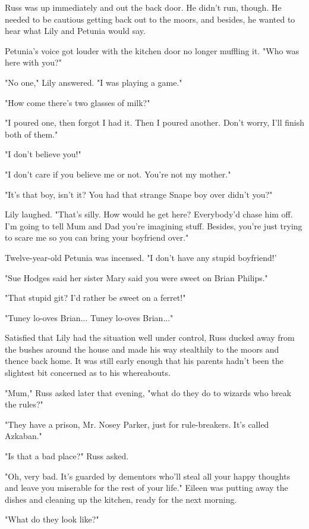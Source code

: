 \documentclass[a4paper,11pt]{article}
\begin{document}
Russ was up immediately and out the back door. He didn't run, though. He needed to be cautious getting back out to the moors, and besides, he wanted to hear what Lily and Petunia would say.

Petunia's voice got louder with the kitchen door no longer muffling it. "Who was here with you?"

"No one," Lily answered. "I was playing a game."

"How come there's two glasses of milk?"

"I poured one, then forgot I had it. Then I poured another. Don't worry, I'll finish both of them."

"I don't believe you!"

"I don't care if you believe me or not. You're not my mother."

"It's that boy, isn't it? You had that strange Snape boy over didn't you?"

Lily laughed. "That's silly. How would he get here? Everybody'd chase him off. I'm going to tell Mum and Dad you're imagining stuff. Besides, you're just trying to scare me so you can bring your boyfriend over."

Twelve-year-old Petunia was incensed. "I don't have any stupid boyfriend!'

"Sue Hodges said her sister Mary said you were sweet on Brian Philips."

"That stupid git? I'd rather be sweet on a ferret!"

"Tuney lo-oves Brian... Tuney lo-oves Brian..."

Satisfied that Lily had the situation well under control, Russ ducked away from the bushes around the house and made his way stealthily to the moors and thence back home. It was still early enough that his parents hadn't been the slightest bit concerned as to his whereabouts.

"Mum," Russ asked later that evening, "what do they do to wizards who break the rules?"

"They have a prison, Mr. Nosey Parker, just for rule-breakers. It's called Azkaban."

"Is that a bad place?" Russ asked.

"Oh, very bad. It's guarded by dementors who'll steal all your happy thoughts and leave you miserable for the rest of your life." Eileen was putting away the dishes and cleaning up the kitchen, ready for the next morning.

"What do they look like?"
\end{document}
